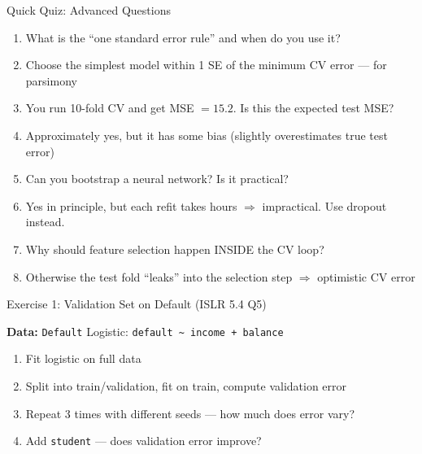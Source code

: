\documentclass[aspectratio=169, 11pt]{beamer}
\begin{document}
\begin{frame}{Quick Quiz: Advanced Questions}
\begin{enumerate}
  \item What is the ``one standard error rule'' and when do you use it?
  \pause
  \item[]{\textcolor{muted}{\footnotesize Choose the simplest model within 1 SE of the minimum CV error --- for parsimony}}

  \vspace{0.3em}
  \item You run 10-fold CV and get MSE $= 15.2$. Is this the expected test MSE?
  \pause
  \item[]{\textcolor{muted}{\footnotesize Approximately yes, but it has some bias (slightly overestimates true test error)}}

  \vspace{0.3em}
  \item Can you bootstrap a neural network? Is it practical?
  \pause
  \item[]{\textcolor{muted}{\footnotesize Yes in principle, but each refit takes hours $\Rightarrow$ impractical. Use dropout instead.}}

  \vspace{0.3em}
  \item Why should feature selection happen INSIDE the CV loop?
  \pause
  \item[]{\textcolor{muted}{\footnotesize Otherwise the test fold ``leaks'' into the selection step $\Rightarrow$ optimistic CV error}}
\end{enumerate}
\end{frame}


\begin{frame}{Exercise 1: Validation Set on Default (ISLR 5.4 Q5)}

\textbf{Data:} \texttt{Default} \hfill Logistic: \texttt{default \textasciitilde{} income + balance}

\begin{enumerate}
  \item Fit logistic on full data
  \item Split into train/validation, fit on train, compute validation error
  \item Repeat 3 times with different seeds --- how much does error vary?
  \item Add \texttt{student} --- does validation error improve?
\end{enumerate}

\end{frame}
\end{document}
